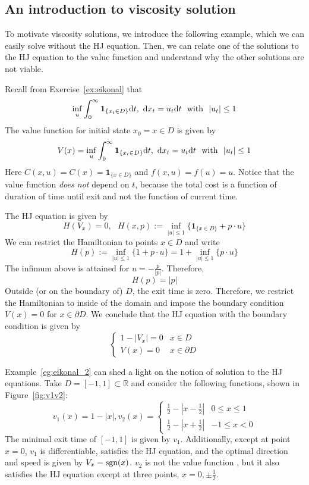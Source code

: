 \documentclass[11pt]{book}
\providecommand{\mathds}[1]{\mathbf{#1}}
\newcommand{\dt}{\text{\normalfont d}t}
\newcommand{\dx}{\text{\normalfont d}x}
\begin{document}
\subsection{An introduction to viscosity solution}
To motivate viscosity solutions, we introduce the following example, which we can easily solve without the HJ equation. Then, we can relate one of the solutions to the HJ equation to the value function and understand why the other solutions are not viable.
\begin{eg}
\label{eg:eikonal_2}
    Recall from Exercise~\ref{ex:eikonal} that
    \[
        \inf_u\int_0^\infty \mathds{1}_{\{x_t\in D\}}{\dt},~{\dx}_t=u_t{\dt}~\text{ with }~|u_t|\le1
    \]
    The value function for initial state $x_0=x\in D$ is given by
    \[
        V(x)=\inf_u\int_0^\infty \mathds{1}_{\{x_t\in D\}}{\dt},~{\dx}_t=u_t{\dt}~\text{ with }~|u_t|\le1
    \]
    Here $C(x,u)=C(x)=\mathds{1}_{\{x\in D\}}$ and $f(x,u)=f(u)=u$.
    Notice that the value function \emph{does not} depend on $t$, because the total cost is a function of duration of time until exit and not the function of current time.

    The HJ equation is given by
    \[
    H(V_x)=0,~~~H(x,p):=\inf_{|u|\le1}\{\mathds{1}_{\{x\in D\}}+p\cdot u\}
    \]
    We can restrict the Hamiltonian to points $x\in D$ and write 
    \[
    H(p):=\inf_{|u|\le1}\{1+p\cdot u\}=1+\inf_{|u|\le1}\{p\cdot u\}
    \]
    The infimum above is attained for $u=-\frac{p}{|p|}$. Therefore,
    \[
    H(p)=|p|
    \]
    Outside (or on the boundary of) $D$, the exit time is zero. Therefore, we restrict the Hamiltonian to inside of the domain and impose the boundary condition $V(x)=0$ for $x\in\partial D$. We conclude that the HJ equation with the boundary condition is given by
    \[
    \begin{cases}
        1-|V_x|=0&x\in D\\
        V(x)=0&x\in \partial D
    \end{cases}
    \]
\end{eg}
Example~\ref{eg:eikonal_2} can shed a light on the notion of solution to the HJ equations. Take $D=[-1,1]\subset \mathbb{R}$ and consider the following functions,  shown in Figure~\ref{fig:v1v2}:
        \[
        v_1(x) = 1-|x|, v_2(x)= \begin{cases}
            \frac12-|x-\frac12|&0\le x\le1\\
            \frac12-|x+\frac12|&-1\le x<0
        \end{cases}
        \]
The minimal exit time of $[-1,1]$ is given by $v_1$. Additionally, except at point $x=0$, $v_1$ is differentiable, satisfies the HJ equation, and the optimal direction and speed is given by $V_x=\text{\normalfont sgn}(x)$. $v_2$ is not the value function  , but it also satisfies the HJ equation except at three points, $x=0,\pm\frac12$. 
\end{document}
